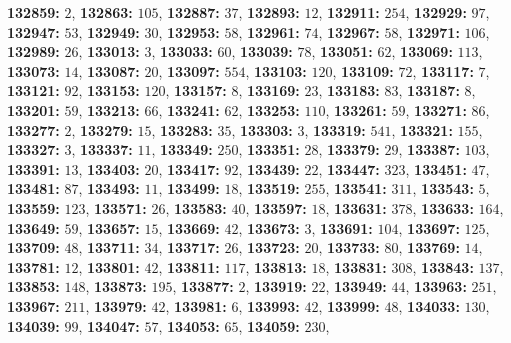 \textsf{\bfseries 132859:} $2$, \textsf{\bfseries 132863:} $105$, \textsf{\bfseries 132887:} $37$, \textsf{\bfseries 132893:} $12$, \textsf{\bfseries 132911:} $254$, \textsf{\bfseries 132929:} $97$, \textsf{\bfseries 132947:} $53$, \textsf{\bfseries 132949:} $30$, \textsf{\bfseries 132953:} $58$, \textsf{\bfseries 132961:} $74$, \textsf{\bfseries 132967:} $58$, \textsf{\bfseries 132971:} $106$, \textsf{\bfseries 132989:} $26$, \textsf{\bfseries 133013:} $3$, \textsf{\bfseries 133033:} $60$, \textsf{\bfseries 133039:} $78$, \textsf{\bfseries 133051:} $62$, \textsf{\bfseries 133069:} $113$, \textsf{\bfseries 133073:} $14$, \textsf{\bfseries 133087:} $20$, \textsf{\bfseries 133097:} $554$, \textsf{\bfseries 133103:} $120$, \textsf{\bfseries 133109:} $72$, \textsf{\bfseries 133117:} $7$, \textsf{\bfseries 133121:} $92$, \textsf{\bfseries 133153:} $120$, \textsf{\bfseries 133157:} $8$, \textsf{\bfseries 133169:} $23$, \textsf{\bfseries 133183:} $83$, \textsf{\bfseries 133187:} $8$, \textsf{\bfseries 133201:} $59$, \textsf{\bfseries 133213:} $66$, \textsf{\bfseries 133241:} $62$, \textsf{\bfseries 133253:} $110$, \textsf{\bfseries 133261:} $59$, \textsf{\bfseries 133271:} $86$, \textsf{\bfseries 133277:} $2$, \textsf{\bfseries 133279:} $15$, \textsf{\bfseries 133283:} $35$, \textsf{\bfseries 133303:} $3$, \textsf{\bfseries 133319:} $541$, \textsf{\bfseries 133321:} $155$, \textsf{\bfseries 133327:} $3$, \textsf{\bfseries 133337:} $11$, \textsf{\bfseries 133349:} $250$, \textsf{\bfseries 133351:} $28$, \textsf{\bfseries 133379:} $29$, \textsf{\bfseries 133387:} $103$, \textsf{\bfseries 133391:} $13$, \textsf{\bfseries 133403:} $20$, \textsf{\bfseries 133417:} $92$, \textsf{\bfseries 133439:} $22$, \textsf{\bfseries 133447:} $323$, \textsf{\bfseries 133451:} $47$, \textsf{\bfseries 133481:} $87$, \textsf{\bfseries 133493:} $11$, \textsf{\bfseries 133499:} $18$, \textsf{\bfseries 133519:} $255$, \textsf{\bfseries 133541:} $311$, \textsf{\bfseries 133543:} $5$, \textsf{\bfseries 133559:} $123$, \textsf{\bfseries 133571:} $26$, \textsf{\bfseries 133583:} $40$, \textsf{\bfseries 133597:} $18$, \textsf{\bfseries 133631:} $378$, \textsf{\bfseries 133633:} $164$, \textsf{\bfseries 133649:} $59$, \textsf{\bfseries 133657:} $15$, \textsf{\bfseries 133669:} $42$, \textsf{\bfseries 133673:} $3$, \textsf{\bfseries 133691:} $104$, \textsf{\bfseries 133697:} $125$, \textsf{\bfseries 133709:} $48$, \textsf{\bfseries 133711:} $34$, \textsf{\bfseries 133717:} $26$, \textsf{\bfseries 133723:} $20$, \textsf{\bfseries 133733:} $80$, \textsf{\bfseries 133769:} $14$, \textsf{\bfseries 133781:} $12$, \textsf{\bfseries 133801:} $42$, \textsf{\bfseries 133811:} $117$, \textsf{\bfseries 133813:} $18$, \textsf{\bfseries 133831:} $308$, \textsf{\bfseries 133843:} $137$, \textsf{\bfseries 133853:} $148$, \textsf{\bfseries 133873:} $195$, \textsf{\bfseries 133877:} $2$, \textsf{\bfseries 133919:} $22$, \textsf{\bfseries 133949:} $44$, \textsf{\bfseries 133963:} $251$, \textsf{\bfseries 133967:} $211$, \textsf{\bfseries 133979:} $42$, \textsf{\bfseries 133981:} $6$, \textsf{\bfseries 133993:} $42$, \textsf{\bfseries 133999:} $48$, \textsf{\bfseries 134033:} $130$, \textsf{\bfseries 134039:} $99$, \textsf{\bfseries 134047:} $57$, \textsf{\bfseries 134053:} $65$, \textsf{\bfseries 134059:} $230$, 
